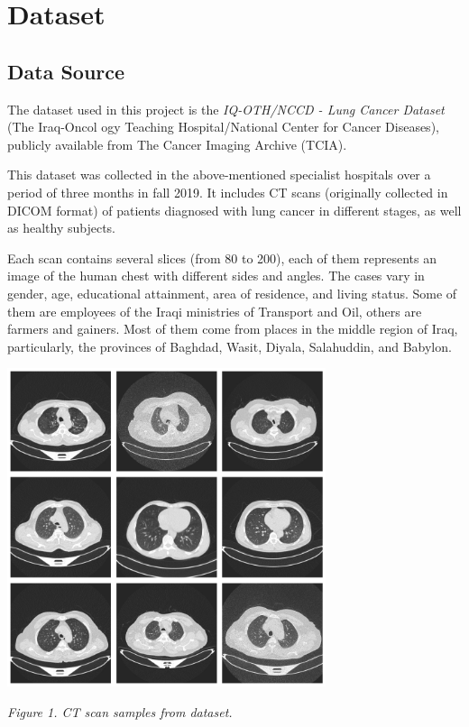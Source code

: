 

\section{Dataset}

\subsection{Data Source}
The dataset used in this project is the {\textit{IQ-OTH/NCCD - Lung Cancer Dataset}} (The Iraq-Oncol
ogy Teaching Hospital/National Center for Cancer Diseases), publicly available from The Cancer 
Imaging Archive (TCIA). \cite{subhajeet_das_2025}

This dataset was collected in the above-mentioned specialist hospitals over a period of three months 
in fall 2019. It includes CT scans (originally collected in DICOM format) of patients diagnosed 
with lung cancer in different stages, as well as healthy subjects. 

Each scan contains several slices (from 80 to 200), each of them represents an image of the human 
chest with different sides and angles. The cases vary in gender, age, educational attainment, area 
of residence, and living status. Some of them are employees of the Iraqi ministries of Transport and 
Oil, others are farmers and gainers. Most of them come from places in the middle region of Iraq,  
particularly, the provinces of Baghdad, Wasit, Diyala, Salahuddin, and Babylon.

\vspace{1em}
\begin{center} 
    \includegraphics[width=0.7\textwidth]{../assets/02-dataset/ct-scans.png}

    \small\textit{Figure 1. CT scan samples from dataset.}
\end{center}
\vspace{1em}


